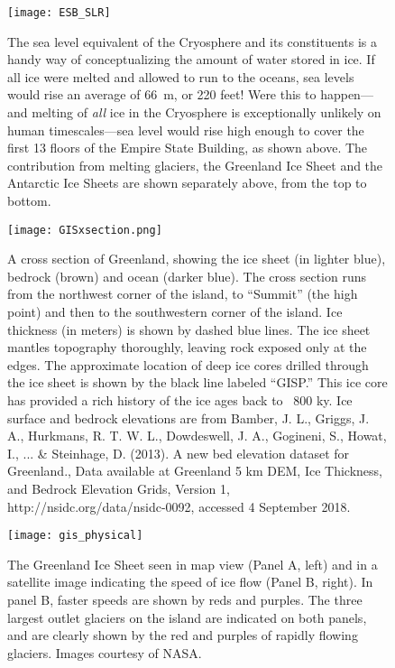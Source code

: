 \begin{figure}[p]
	\centering
  \texttt{[image: ESB\_SLR]}%
	\caption{The sea level equivalent of the Cryosphere and its constituents is a handy way of conceptualizing the amount of water stored in ice. If all ice were melted and allowed to run to the oceans, sea levels would rise an average of \SI{66}{\metre}, or 220 feet! Were this to happen---and melting of \emph{all} ice in the Cryosphere is exceptionally unlikely on human timescales---sea level would rise high enough to cover the first 13 floors of the Empire State Building, as shown above. The contribution from melting glaciers, the Greenland Ice Sheet and the Antarctic Ice Sheets are shown separately above, from the top to bottom.}  
	\label{fig:ESB}
\end{figure}


\begin{figure}[p]
	\centering
  \texttt{[image: GISxsection.png]}%
	\caption{A cross section of Greenland, showing the ice sheet (in lighter blue), bedrock (brown) and ocean (darker blue). The cross section runs from the northwest corner of the island, to ``Summit'' (the high point) and then to the southwestern corner of the island. Ice thickness (in meters) is shown by dashed blue lines. The ice sheet mantles topography thoroughly, leaving rock exposed only at the edges. The approximate location of deep ice cores drilled through the ice sheet is shown by the black line labeled ``GISP.'' This ice core has provided a rich history of the ice ages back to ~800 ky. Ice surface and bedrock elevations are from Bamber, J. L., Griggs, J. A., Hurkmans, R. T. W. L., Dowdeswell, J. A., Gogineni, S., Howat, I., ... \& Steinhage, D. (2013). A new bed elevation dataset for Greenland., Data available at Greenland 5 km DEM, Ice Thickness, and Bedrock Elevation Grids, Version 1, http://nsidc.org/data/nsidc-0092, accessed 4 September 2018.}  
	\label{fig:GISxsection}
\end{figure}

\begin{figure}[p]
	\centering
  \texttt{[image: gis\_physical]}%
	\caption{The Greenland Ice Sheet seen in map view (Panel A, left) and in a satellite image indicating the speed of ice flow (Panel B, right). In panel B, faster speeds are shown by reds and purples. The three largest outlet glaciers on the island are indicated on both panels, and are clearly shown by the red and purples of rapidly flowing glaciers. Images courtesy of NASA. }  
	\label{fig:gis_physical}
\end{figure}

